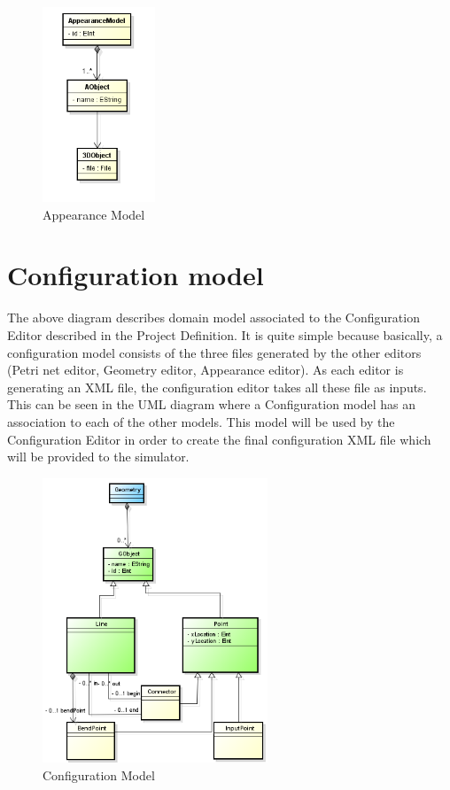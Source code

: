 \documentclass[11pt]{article}   %
\begin{document}
\begin{figure}[htp]
\begin{center}
  \includegraphics[width=0.3\textwidth]{image/appearance_model.png}
  \caption{Appearance Model}
  \label{fig:appearance_model}
\end{center}
\end{figure}

\newpage
\section{Configuration model}

The above diagram describes domain model associated to the Configuration Editor described in the Project Definition. It is quite simple because basically, a configuration model consists of the three files generated by the other editors (Petri net editor, Geometry editor, Appearance editor).
As each editor is generating an XML file, the configuration editor takes all these file as inputs. This can be seen in the UML diagram where a Configuration model has an association to each of the other models.
This model will be used by the Configuration Editor in order to create the final configuration XML file which will be provided to the simulator.

\begin{figure}[htp]
\begin{center}
  \includegraphics[width=0.6\textwidth]{image/geometry_model.png}
  \caption{Configuration Model}
  \label{fig:configuration_model}
\end{center}
\end{figure}
\end{document}
